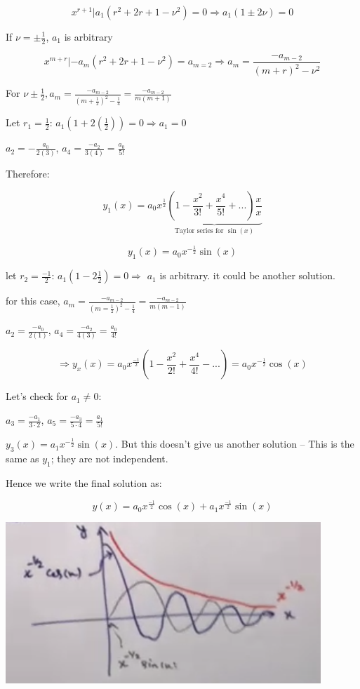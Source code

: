 \documentclass{article}
\begin{document}
$$x^{r+1} | a_1 (r^2 + 2r + 1 - \nu^2) = 0 \Rightarrow a_1 (1 \pm 2 \nu) = 0$$

If $\nu = \pm \frac{1}{2}$, $a_1$ is arbitrary

$$x^{m+r} | -a_m (r^2 + 2r + 1 - \nu^2) = a_{m=2} \Rightarrow a_m = \frac{-a_{m-2}}{(m+r)^2 - \nu^2}$$

For $\nu \pm \frac{1}{2}, a_m = \frac{-a_{m-2}}{(m+\frac{1}{2})^2 - \frac{1}{4}} = \frac{-a_{m-2}}{m(m+1)}$

Let $r_1 = \frac{1}{2}$: $a_1 (1 + 2 (\frac{1}{2})) = 0 \Rightarrow a_1 = 0$

$a_2 = - \frac{a_0}{2(3)}$, $a_4 = \frac{-a_2}{3(4)} = \frac{a_0}{5!}$

Therefore:

$$y_1 (x) = a_0 x^{\frac{1}{2}} \underbrace{\left(1 - \frac{x^2}{3!} + \frac{x^4}{5!} + ... \right) \frac{x}{x}}_{\text{Taylor series for } \sin(x)}$$

$$y_1(x) = a_0 x^{- \frac{1}{2}} \sin(x)$$

let $r_2 = \frac{-1}{2}$: $a_1 (1 - 2 \frac{1}{2}) = 0 \Rightarrow$ $a_1$ is arbitrary. it could be another solution.


for this case, $a_m = \frac{-a_{m - 2}}{(m = \frac{1}{2})^2 - \frac{1}{4}} = \frac{-a_{m - 2}}{m(m-1)}$

$a_2 = \frac{-a_0}{2(1)}$, $a_4 = \frac{-a_2}{4(3)} = \frac{a_0}{4!}$

$$\Rightarrow y_x(x) = a_0 x^{\frac{-1}{2}} \left(1 - \frac{x^2}{2!} + \frac{x^4}{4!} - ... \right) = a_0 x^{- \frac{1}{2}} \cos(x)$$

Let's check for $a_1 \neq 0$:

$a_3 = \frac{-a_1}{3 \cdot 2}$, $a_5 = \frac{-a_3}{5 \cdot 4} = \frac{a_1}{5!}$

$y_3 (x) = a_1 x^{- \frac{1}{2}} \sin(x)$. But this doesn't give us another solution -- This is the same as $y_1$; they are not independent. 

Hence we write the final solution as:

$$y(x) = a_0 x^{\frac{-1}{2}} \cos(x) + a_1 x^{\frac{-1}{2}} \sin(x)$$

\includegraphics[width = 0.9 \textwidth]{image5.png}
\end{document}
